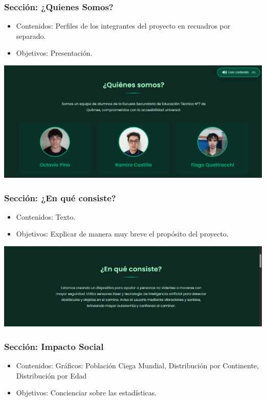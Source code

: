\documentclass[12pt,a4paper]{article}
\begin{document}
\subsubsection*{ Sección: ¿Quienes Somos? }
\begin{itemize}
    \item Contenidos: Perfiles de los integrantes del proyecto en recuadros por separado.
    \item Objetivos: Presentación.
\end{itemize}
\includegraphics[width=\linewidth]{Carpeta tecnica/qnes.png}
\subsubsection*{ Sección: ¿En qué consiste?}
\begin{itemize}
    \item Contenidos: Texto.
    \item Objetivos: Explicar de manera muy breve el propósito del proyecto.
\end{itemize} 

\includegraphics[width=\linewidth]{Carpeta tecnica/cnste.png}

\subsubsection*{Sección: Impacto Social}
\begin{itemize}
    \item Contenidos: Gráficos: Población Ciega Mundial, Distribución por Continente, Distribución por Edad
    \item Objetivos: Concienciar sobre las estadísticas.
\end{itemize}
\end{document}
